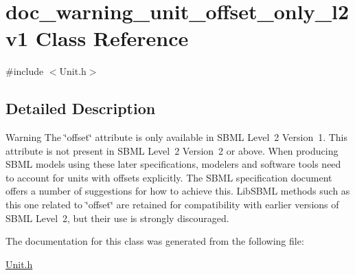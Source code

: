 \hypertarget{classdoc__warning__unit__offset__only__l2v1}{}\section{doc\+\_\+warning\+\_\+unit\+\_\+offset\+\_\+only\+\_\+l2v1 Class Reference}
\label{classdoc__warning__unit__offset__only__l2v1}


{\ttfamily \#include $<$Unit.\+h$>$}



\subsection{Detailed Description}
\begin{DoxyWarning}{Warning}
The \char`\"{}offset\char`\"{} attribute is only available in S\+B\+ML Level~2 Version~1. This attribute is not present in S\+B\+ML Level~2 Version~2 or above. When producing S\+B\+ML models using these later specifications, modelers and software tools need to account for units with offsets explicitly. The S\+B\+ML specification document offers a number of suggestions for how to achieve this. Lib\+S\+B\+ML methods such as this one related to \char`\"{}offset\char`\"{} are retained for compatibility with earlier versions of S\+B\+ML Level~2, but their use is strongly discouraged. 
\end{DoxyWarning}


The documentation for this class was generated from the following file\+:\begin{DoxyCompactItemize}
\item 
\hyperlink{_unit_8h}{Unit.\+h}\end{DoxyCompactItemize}
